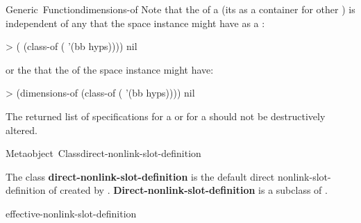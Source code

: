\documentclass[10pt,twoside,english,pdftex]{article}
\begin{document}
\begin{functiondoc}{Generic~Function}{dimensions-of}
%
%
Note that the  of a  (its
 as a container for other ) is
independent of any  that the space instance might have
as a :
%
%
\W\supp
\begin{example}
> ( (class-of ( '(bb hyps))))
nil
\end{example}
%
or the  that the  of the space instance
might have:
%
\W\supp\notpretop
\begin{example}
> (dimensions-of (class-of ( '(bb hyps))))
nil
\end{example}

\fnnote The returned list of  specifications for a
 or for a  should not be destructively
altered.

\end{functiondoc}


\begin{functiondoc}{Metaobject~Class}{direct-nonlink-slot-definition}{}
%

\fnsyntax

\fnpackage {}

\fnmodule {}

\fndescription The class \textbf{direct-nonlink-slot-definition} is the
default direct nonlink-slot-definition  of
 created by \textbf{}.
\textbf{Direct-nonlink-slot-definition} is a subclass of
\textbf{}.

\begin{alsos}{effective-nonlink-slot-definition}
\end{alsos}

\end{functiondoc}

\end{document}

